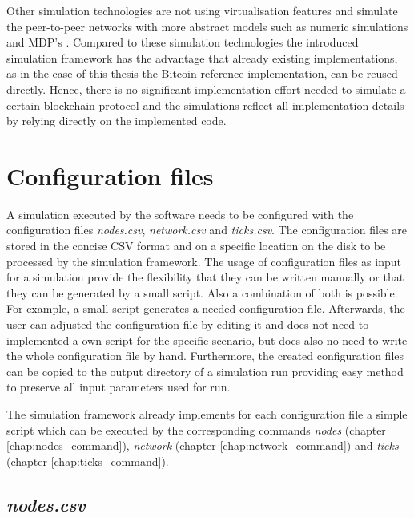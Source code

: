 Other simulation technologies are not using virtualisation features and simulate the peer-to-peer networks with more abstract models such as numeric simulations and MDP's \cite{eyal2014majority, bahack2013theoretical, gervais2015tampering, nayak2016stubborn, sapirshtein2016optimal, gervais2016security}. Compared to these simulation technologies the introduced simulation framework has the advantage that already existing implementations, as in the case of this thesis the Bitcoin reference implementation, can be reused directly.
Hence, there is no significant implementation effort needed to simulate a certain blockchain protocol and the simulations reflect all implementation details by relying directly on the implemented code.

\section{Configuration files}
\label{chap:config_files}

A simulation executed by the software needs to be configured with the configuration files \textit{nodes.csv}, \textit{network.csv} and \textit{ticks.csv}.
The configuration files are stored in the concise CSV format and on a specific location on the disk to be processed by the simulation framework.
The usage of configuration files as input for a simulation provide the flexibility that they can be written manually or that they can be generated by a small script.
Also a combination of both is possible.
For example, a small script generates a needed configuration file.
Afterwards, the user can adjusted the configuration file by editing it and does not need to implemented a own script for the specific scenario, but does also no need to write the whole configuration file by hand.
Furthermore, the created configuration files can be copied to the output directory of a simulation run providing easy method to preserve all input parameters used for run.

The simulation framework already implements for each configuration file a simple script which can be executed by the corresponding commands \textit{nodes} (chapter \ref{chap:nodes_command}), \textit{network} (chapter \ref{chap:network_command}) and \textit{ticks} (chapter \ref{chap:ticks_command}).

\subsection{\textit{nodes.csv}}

